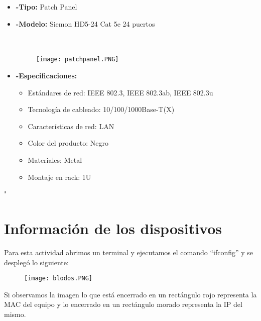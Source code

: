 \documentclass{udpreport}
\begin{document}
\begin{itemize}
		\item{\bf-Tipo:} Patch Panel\\
		\item{\bf-Modelo:} Siemon HD5-24 Cat 5e 24 puertos\\\\\\
		\begin{figure}[h]
    		\centering
    	\texttt{[image: patchpanel.PNG]}
		\end{figure}
		\item{\bf-Especificaciones:}
		\begin{itemize}
			\item Estándares de red: IEEE 802.3, IEEE 802.3ab, IEEE 802.3u\\
			\item Tecnología de cableado: 10/100/1000Base-T(X)\\
			\item Características de red: LAN\\
			\item Color del producto: Negro\\
			\item Materiales: Metal\\
			\item Montaje en rack: 1U\\
		\end{itemize}
	\end{itemize}"
	\section{Información de los dispositivos}
		Para esta actividad abrimos un terminal y ejecutamos el comando ``ifconfig'' y se desplegó lo siguiente:\\
		\begin{figure}[h]
    		\centering
    	\texttt{[image: blodos.PNG]}
		\end{figure}
		Si observamos la imagen lo que está encerrado en un rectángulo rojo representa la MAC del equipo y lo encerrado en un
		rectángulo morado representa la IP del mismo.
\end{document}
